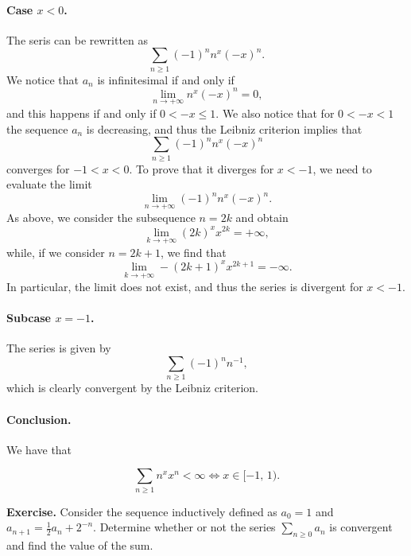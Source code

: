 \documentclass[a4paper,10 pt]{report}
\newcommand{\finalanswer}[1]{%
    \begin{finalAnswer}
    \[
        #1
    \]
    \end{finalAnswer}
}
\theoremstyle{definition}
\begin{document}
\begin{solutionBox}
\paragraph{Case $x < 0$.} The seris can be rewritten as
\begin{equation*} \sum_{n \geq 1} (-1)^n n^x (-x)^n. \end{equation*}
We notice that $a_n$ is infinitesimal if and only if
\begin{equation*} \lim_{n \to + \infty}  n^x (-x)^n = 0, \end{equation*}
and this happens if and only if $0 < -x \leq 1$. We also notice that for $0 < - x < 1$ the sequence $a_n$ is decreasing, and thus the Leibniz criterion implies that
\begin{equation*} \sum_{n \geq 1} (-1)^n n^x (-x)^n\end{equation*}
converges for $- 1 < x < 0$. To prove that it diverges for $x < - 1$, we need to evaluate the limit
\begin{equation*} \lim_{n \to + \infty} (-1)^n n^x (-x)^n. \end{equation*}
As above, we consider the subsequence $n = 2k$ and obtain
\begin{equation*} \lim_{k \to + \infty}(2k)^x x^{2k} = + \infty, \end{equation*}
while, if we consider $n = 2k + 1$, we find that
\begin{equation*} \lim_{k \to + \infty}- (2k + 1)^x x^{2k + 1} = - \infty. \end{equation*}
In particular, the limit does not exist, and thus the series is divergent for $x < -1$.

\paragraph{Subcase $x = -1$.} The series is given by
\begin{equation*} \sum_{n \geq 1} (-1)^n n^{-1}, \end{equation*}
which is clearly convergent by the Leibniz criterion.

\paragraph{Conclusion.} We have that
\finalanswer{
 \sum_{n \geq 1} n^x x^n < \infty \iff x \in [-1, \, 1).
}
\end{solutionBox}

\begin{exerciseBox} \textbf{Exercise.}  Consider the sequence inductively defined as $a_0 = 1$ and $a_{n + 1} = \frac{1}{2}a_n + 2^{-n}$. Determine whether or not the series $\sum_{n \geq 0} a_n$ is convergent and find the value of the sum. \end{exerciseBox}
\end{document}
